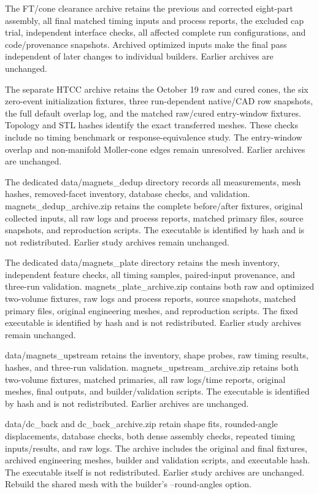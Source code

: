 The FT/cone clearance archive retains the previous and corrected eight-part assembly, all final matched timing
inputs and process reports, the excluded cap trial, independent interface checks, all affected complete run
configurations, and code/provenance snapshots. Archived optimized inputs make the final pass independent of
later changes to individual builders. Earlier archives are unchanged.

The separate HTCC archive retains the October 19 raw and cured cones, the six zero-event initialization
fixtures, three run-dependent native/CAD row snapshots, the full default overlap log, and the matched
raw/cured entry-window fixtures. Topology and STL hashes identify the exact transferred meshes. These checks
include no timing benchmark or response-equivalence study. The entry-window overlap and non-manifold
Moller-cone edges remain unresolved. Earlier archives are unchanged.


The dedicated data/magnets\_dedup directory records all measurements, mesh hashes, removed-facet inventory,
database checks, and validation. magnets\_dedup\_archive.zip retains the complete before/after fixtures,
original collected inputs, all raw logs and process reports, matched primary files, source snapshots, and
reproduction scripts. The executable is identified by hash and is not redistributed. Earlier study archives
remain unchanged.


The dedicated data/magnets\_plate directory retains the mesh inventory, independent feature checks, all timing
samples, paired-input provenance, and three-run validation. magnets\_plate\_archive.zip contains both raw and
optimized two-volume fixtures, raw logs and process reports, source snapshots, matched primary files, original
engineering meshes, and reproduction scripts. The fixed executable is identified by hash and is not
redistributed. Earlier study archives remain unchanged.


data/magnets\_upstream retains the inventory, shape probes, raw timing results, hashes, and three-run
validation. magnets\_upstream\_archive.zip retains both two-volume fixtures, matched primaries, all raw
logs/time reports, original meshes, final outputs, and builder/validation scripts. The executable is
identified by hash and is not redistributed. Earlier archives are unchanged.


data/dc\_back and dc\_back\_archive.zip retain shape fits, rounded-angle displacements, database checks, both
dense assembly checks, repeated timing inputs/results, and raw logs. The archive includes the original and
final fixtures, archived engineering meshes, builder and validation scripts, and executable hash. The
executable itself is not redistributed. Earlier study archives are unchanged. Rebuild the shared mesh with the
builder's --round-angles option.



